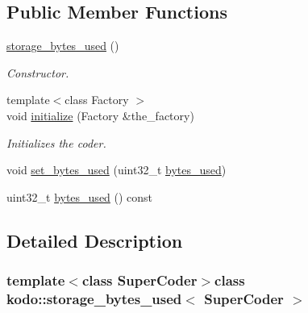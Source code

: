 \subsection*{Public Member Functions}
\begin{DoxyCompactItemize}
\item 
\hypertarget{classkodo_1_1storage__bytes__used_ac68151a077cfd84c0f959eb1db748a08}{\hyperlink{classkodo_1_1storage__bytes__used_ac68151a077cfd84c0f959eb1db748a08}{storage\-\_\-bytes\-\_\-used} ()}\label{classkodo_1_1storage__bytes__used_ac68151a077cfd84c0f959eb1db748a08}

\begin{DoxyCompactList}\small\item\em Constructor. \end{DoxyCompactList}\item 
{\footnotesize template$<$class Factory $>$ }\\void \hyperlink{classkodo_1_1storage__bytes__used_ab86faa764ff40a4f681bdfcefe6d2095}{initialize} (Factory \&the\-\_\-factory)
\begin{DoxyCompactList}\small\item\em Initializes the coder. \end{DoxyCompactList}\item 
void \hyperlink{classkodo_1_1storage__bytes__used_a4e186078f0062bbb00a17f15bb061356}{set\-\_\-bytes\-\_\-used} (uint32\-\_\-t \hyperlink{classkodo_1_1storage__bytes__used_a16d5cdaadd83521e9a77192a5eceacd8}{bytes\-\_\-used})
\begin{DoxyCompactList}\small\item\em \end{DoxyCompactList}\item 
uint32\-\_\-t \hyperlink{classkodo_1_1storage__bytes__used_a16d5cdaadd83521e9a77192a5eceacd8}{bytes\-\_\-used} () const 
\begin{DoxyCompactList}\small\item\em \end{DoxyCompactList}\end{DoxyCompactItemize}


\subsection{Detailed Description}
\subsubsection*{template$<$class Super\-Coder$>$class kodo\-::storage\-\_\-bytes\-\_\-used$<$ Super\-Coder $>$}

